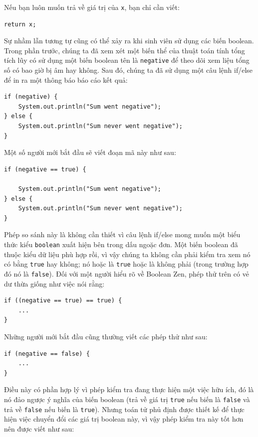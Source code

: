 Nếu bạn luôn muốn trả về giá trị của \texttt{x}, bạn chỉ cần viết:

\begin{verbatim}
return x;
\end{verbatim}

Sự nhầm lẫn tương tự cũng có thể xảy ra khi sinh viên sử dụng các biến boolean. Trong phần trước, chúng ta đã xem xét một biến thể của thuật toán tính tổng tích lũy có sử dụng một biến boolean tên là \texttt{negative} để theo dõi xem liệu tổng số có bao giờ bị âm hay không. Sau đó, chúng ta đã sử dụng một câu lệnh if/else để in ra một thông báo báo cáo kết quả:

\begin{verbatim}
if (negative) {
    System.out.println("Sum went negative");
} else {
    System.out.println("Sum never went negative");
}
\end{verbatim}

Một số người mới bắt đầu sẽ viết đoạn mã này như sau:

\begin{verbatim}
if (negative == true) {

    System.out.println("Sum went negative");
} else {
    System.out.println("Sum never went negative");
}
\end{verbatim}

Phép so sánh này là không cần thiết vì câu lệnh if/else mong muốn một biểu thức kiểu \texttt{boolean} xuất hiện bên trong dấu ngoặc đơn. Một biến boolean đã thuộc kiểu dữ liệu phù hợp rồi, vì vậy chúng ta không cần phải kiểm tra xem nó có bằng \texttt{true} hay không; nó hoặc là \texttt{true} hoặc là không phải (trong trường hợp đó nó là \texttt{false}). Đối với một người hiểu rõ về Boolean Zen, phép thử trên có vẻ dư thừa giống như việc nói rằng:

\begin{verbatim}
if ((negative == true) == true) {
    ...
}
\end{verbatim}

Những người mới bắt đầu cũng thường viết các phép thử như sau:

\begin{verbatim}
if (negative == false) {
    ...
}
\end{verbatim}
Điều này có phần hợp lý vì phép kiểm tra đang thực hiện một việc hữu ích, đó là nó đảo ngược ý nghĩa của biến boolean (trả về giá trị \texttt{true} nếu biến là \texttt{false} và trả về \texttt{false} nếu biến là \texttt{true}). Nhưng toán tử phủ định được thiết kế để thực hiện việc chuyển đổi các giá trị boolean này, vì vậy phép kiểm tra này tốt hơn nên được viết như sau:

